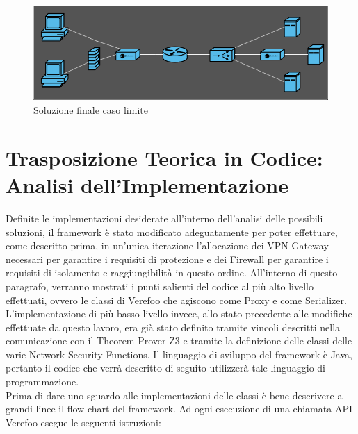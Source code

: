 \begin{figure}[h]  %
    \centering
    \includegraphics[width=1\textwidth]{CasoLimite4.png}  %
    \caption{Soluzione finale caso limite}
    \label{fig:CasoLimite4}
\end{figure}


\section{Trasposizione Teorica in Codice: Analisi dell'Implementazione}
Definite le implementazioni desiderate all'interno dell'analisi delle possibili soluzioni, il framework è stato modificato adeguatamente per poter effettuare, come descritto prima, in un'unica iterazione
l'allocazione dei VPN Gateway necessari per garantire i requisiti di protezione e dei Firewall per garantire i requisiti di isolamento e raggiungibilità in questo ordine. All'interno di questo paragrafo, verranno mostrati
i punti salienti del codice al più alto livello effettuati, ovvero le classi di Verefoo che agiscono come Proxy e come Serializer. L'implementazione di più basso livello invece, allo stato precedente alle modifiche effettuate da questo lavoro, era già stato definito tramite vincoli 
descritti nella comunicazione con il Theorem Prover Z3 e tramite la definizione delle classi delle varie Network Security Functions.
Il linguaggio di sviluppo del framework è Java, pertanto il codice che verrà descritto di seguito utilizzerà
tale linguaggio di programmazione. \\
Prima di dare uno sguardo alle implementazioni delle classi è bene descrivere a grandi linee il flow chart del framework. Ad ogni esecuzione di una chiamata API Verefoo esegue le seguenti istruzioni:

